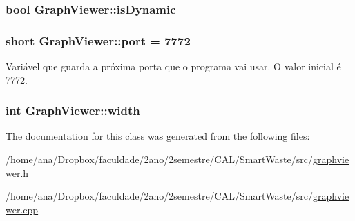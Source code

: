 \subsubsection[{\texorpdfstring{is\+Dynamic}{isDynamic}}]{\setlength{\rightskip}{0pt plus 5cm}bool Graph\+Viewer\+::is\+Dynamic\hspace{0.3cm}{\ttfamily [private]}}\hypertarget{classGraphViewer_a9d9947154bc63354c6d02a0680aad952}{}\label{classGraphViewer_a9d9947154bc63354c6d02a0680aad952}
\subsubsection[{\texorpdfstring{port}{port}}]{\setlength{\rightskip}{0pt plus 5cm}short Graph\+Viewer\+::port = 7772\hspace{0.3cm}{\ttfamily [static]}}\hypertarget{classGraphViewer_a89d0abe75f41feededc49497cc514342}{}\label{classGraphViewer_a89d0abe75f41feededc49497cc514342}
Variável que guarda a próxima porta que o programa vai usar. O valor inicial é 7772. 
\subsubsection[{\texorpdfstring{width}{width}}]{\setlength{\rightskip}{0pt plus 5cm}int Graph\+Viewer\+::width\hspace{0.3cm}{\ttfamily [private]}}\hypertarget{classGraphViewer_a5de27a1d20968b8494cd4bf5a4eb27e1}{}\label{classGraphViewer_a5de27a1d20968b8494cd4bf5a4eb27e1}


The documentation for this class was generated from the following files\+:\begin{DoxyCompactItemize}
\item 
/home/ana/\+Dropbox/faculdade/2ano/2semestre/\+C\+A\+L/\+Smart\+Waste/src/\hyperlink{graphviewer_8h}{graphviewer.\+h}\item 
/home/ana/\+Dropbox/faculdade/2ano/2semestre/\+C\+A\+L/\+Smart\+Waste/src/\hyperlink{graphviewer_8cpp}{graphviewer.\+cpp}\end{DoxyCompactItemize}
